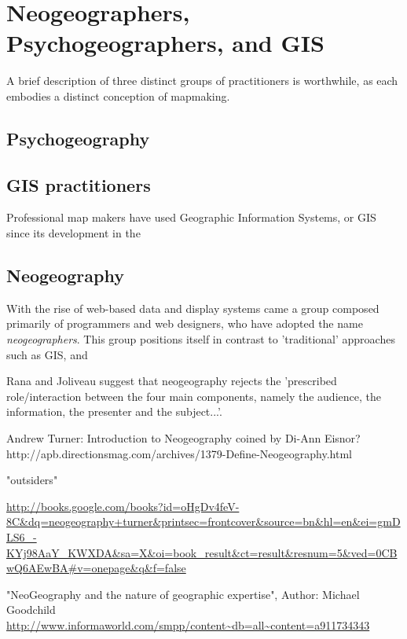 \documentclass[11pt]{report}
\begin{document}
\section{Neogeographers, Psychogeographers, and GIS}

A brief description of three distinct groups of practitioners is worthwhile, as each embodies a distinct conception of mapmaking. 

\subsection{Psychogeography}

\subsection{GIS practitioners}

Professional map makers have used Geographic Information Systems, or GIS since its development in the 

\subsection{Neogeography}

With the rise of web-based data and display systems came a group composed primarily of programmers and web designers, who have adopted the name \emph{neogeographers}. This group positions itself in contrast to 'traditional' approaches such as GIS, and 


Rana and Joliveau suggest that neogeography rejects the 'prescribed role/interaction between the four main components, namely the audience, the information, the presenter and the subject...'. 



Andrew Turner: Introduction to Neogeography
coined by Di-Ann Eisnor?
http://apb.directionsmag.com/archives/1379-Define-Neogeography.html

"outsiders"

\url{http://books.google.com/books?id=oHgDv4feV-8C&dq=neogeography+turner&printsec=frontcover&source=bn&hl=en&ei=gmDLS6_-KYj98AaY_KWXDA&sa=X&oi=book_result&ct=result&resnum=5&ved=0CBwQ6AEwBA#v=onepage&q&f=false}

"NeoGeography and the nature of geographic expertise", Author: Michael Goodchild  \url{http://www.informaworld.com/smpp/content~db=all~content=a911734343}
\end{document}
